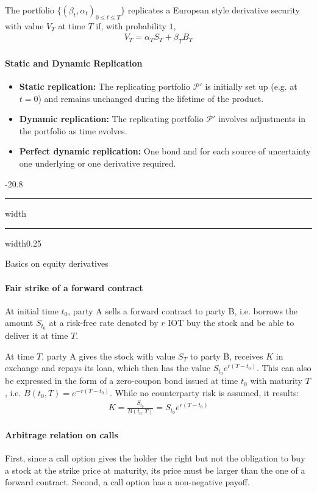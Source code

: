 \documentclass[a4paper,landscape,7pt,fleqn]{scrartcl}
\makeatletter
\renewcommand{\emph}[1]{\textbf{#1}}
\renewcommand{\subsection}{\@startsection{subsection}{1}{0mm}%
{-2\baselineskip}{0.8\baselineskip}%
{\hrule depth 0.2pt width\columnwidth\hrule depth0.75pt
width0.25\columnwidth\vspace*{1.2em}\large\bfseries}}
\makeatother
\begin{document}
\begin{multicols*}{3}
The portfolio $\{ (\beta_t, \alpha_t )_{0 \leq t \leq T} \}$ replicates a European style derivative security with value $V_T$ at time $T$ if, with probability $1$,
\begin{align*}
V_T = \alpha_T S_T + \beta_T B_T
\end{align*}

\paragraph{Static and Dynamic Replication}
\begin{itemize}
\item \emph{Static replication:} The replicating portfolio $\mathcal{P}'$ is initially set up (e.g. at $t=0$) and remains unchanged during the lifetime of the product.
\item \emph{Dynamic replication:} The replicating portfolio $\mathcal{P}'$ involves adjustments in the portfolio as time evolves.
\item \emph{Perfect dynamic replication:} One bond and for each source of uncertainty one underlying or one derivative required.
\end{itemize}

\subsection{Basics on equity derivatives}

\paragraph{Fair strike of a forward contract}
At initial time $t_0$, party A sells a forward contract to party B, i.e. borrows the amount $S_{t_0}$ at a risk-free rate denoted by $r$ IOT buy the stock and be able to deliver it at time $T$.

At time $T$, party A gives the stock with value $S_T$ to party B, receives $K$ in exchange and repays its loan, which then has the value $S_{t_0} e^{r (T - t_0)}$. This can also be expressed in the form of a zero-coupon bond issued at time $t_0$ with maturity $T$, i.e. $B(t_0,T) = e^{-r (T - t_0)}$. While no counterparty risk is assumed, it results:
\begin{align*}
K = \frac{S_{t_0}}{B(t_0,T)} = S_{t_0} e^{r (T - t_0)}
\end{align*}

\paragraph{Arbitrage relation on calls}
First, since a call option gives the holder the right but not the obligation to buy a stock at the strike price at maturity, its price must be larger than the one of a forward contract. Second, a call option has a non-negative payoff.


\end{multicols*}
\end{document}
